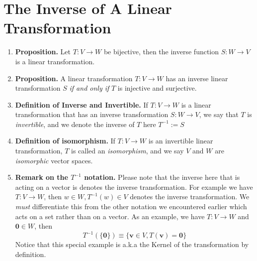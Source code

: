\documentclass[oneside, 12pt]{book}
\newcommand{\settag}[1]{\renewcommand{\theenumi}{#1}}
\newcommand{\tbf}[1]{\textbf{#1}}
\newcommand{\tit}[1]{\textit{#1}}
\newcommand{\trans}[3]{$#1:#2\rightarrow{}#3$}
\newcommand{\para}[1]{\item \tbf{#1}}
\newcommand{\vv}{\mathbf{v}}
\begin{document}
\section{The Inverse of A Linear Transformation}
\begin{enumerate}
    \settag{2.6.1}
    \para{Proposition.} Let \trans{T}{V}{W} be bijective, then the inverse function \trans{S}{W}{V} is a linear transformation.
    
    \settag{2.6.2}
    \para{Proposition.} A linear transformation \trans{T}{V}{W} has an inverse linear transformation $S$ \tit{if and only if} $T$ is injective and surjective.
    
    \settag{2.6.3}
    \para{Definition of Inverse and Invertible.} If \trans{T}{V}{W} is a linear transformation that has an inverse transformation \trans{S}{W}{V}, we say that $T$ is \tit{invertible}, and we denote the inverse of $T$ here $T^{-1} := S$ 
    
    \settag{2.6.4}
    \para{Definition of isomorphism.} If \trans{T}{V}{W} is an invertible linear transformation, $T$ is called an \tit{isomorphism}, and we say $V$ and $W$ are \tit{isomorphic} vector spaces.
    
    \settag{2.6.5}
    \para{Remark on the $T^{-1}$ notation.} Please note that the inverse here that is acting on a vector is denotes the inverse transformation. For example we have \trans{T}{V}{W}, then $w\in W, T^{-1}(w)\in V$ denotes the inverse transformation. We \textit{must} differentiate this from the other notation we encountered earlier which acts on a set rather than on a vector. As an example, we have \trans{T}{V}{W} and $\mathbf{0}\in W$, then
    \begin{equation*}
        T^{-1}\left(\{\mathbf{0}\}\right) \equiv \{\vv\in V, T(\vv) = \mathbf{0}\}
    \end{equation*}
    Notice that this special example is a.k.a the Kernel of the transformation by definition.
    

\end{enumerate}
\end{document}
